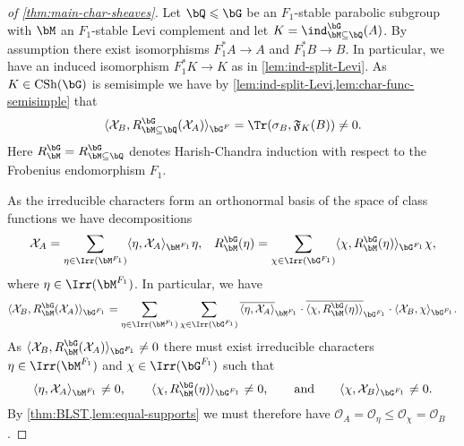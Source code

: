 \documentclass[eqthmnum,nocolour,skinny]{jt-calcs}
\DeclareMathOperator{\CS}{CSh}
\begin{document}
\begin{proof}[of \cref{thm:main-char-sheaves}]
Let $\bQ \leqslant \bG$ be an $F_1$-stable parabolic subgroup with $\bM$ an $F_1$-stable Levi complement and let $K = \ind_{\bM\subseteq\bQ}^{\bG}(A)$. By assumption there exist isomorphisms $F_1^*A \to A$ and $F_1^*B \to B$. In particular, we have an induced isomorphism $F_1^*K \to K$ as in \cref{lem:ind-split-Levi}. As $K \in \CS(\bG)$ is semisimple we have by \cref{lem:ind-split-Levi,lem:char-func-semisimple} that
\begin{equation*}
\langle \mathcal{X}_B, R_{\bM\subseteq\bQ}^{\bG}(\mathcal{X}_A) \rangle_{\bG^F} = \Tr(\sigma_B,\mathfrak{F}_K(B)) \neq 0.
\end{equation*}
Here $R_{\bM}^{\bG} = R_{\bM\subseteq\bQ}^{\bG}$ denotes Harish-Chandra induction with respect to the Frobenius endomorphism $F_1$.

As the irreducible characters form an orthonormal basis of the space of class functions we have decompositions
\begin{align*}
\mathcal{X}_A = \sum_{\eta \in \Irr(\bM^{F_1})} \langle \eta, \mathcal{X}_A\rangle_{\bM^{F_1}}\eta, &&  R_{\bM}^{\bG}(\eta) = \sum_{\chi \in \Irr(\bG^{F_1})} \langle \chi, R_{\bM}^{\bG}(\eta)\rangle_{\bG^{F_1}}\chi,
\end{align*}
where $\eta \in \Irr(\bM^{F_1})$. In particular, we have
\begin{equation*}
\langle \mathcal{X}_B, R_{\bM}^{\bG}(\mathcal{X}_A)\rangle_{\bG^{F_1}} = \sum_{\eta \in \Irr(\bM^{F_1})}\sum_{\chi \in \Irr(\bG^{F_1})} \overline{\langle \eta, \mathcal{X}_A\rangle}_{\bM^{F_1}}\cdot\overline{\langle \chi, R_{\bM}^{\bG}(\eta)\rangle}_{\bG^{F_1}}\cdot\langle \mathcal{X}_B, \chi\rangle_{\bG^{F_1}}.
\end{equation*}
As $\langle \mathcal{X}_B, R_{\bM}^{\bG}(\mathcal{X}_A)\rangle_{\bG^{F_1}} \neq 0$ there must exist irreducible characters $\eta \in \Irr(\bM^{F_1})$ and $\chi \in \Irr(\bG^{F_1})$ such that
\begin{equation*}
\langle \eta, \mathcal{X}_A\rangle_{\bM^{F_1}} \neq 0, \qquad \langle \chi, R_{\bM}^{\bG}(\eta)\rangle_{\bG^{F_1}} \neq 0, \qquad\text{and}\qquad \langle \chi,\mathcal{X}_B\rangle_{\bG^{F_1}} \neq 0.
\end{equation*}
By \cref{thm:BLST,lem:equal-supports} we must therefore have $\mathcal{O}_A = \mathcal{O}_{\eta} \leqslant \mathcal{O}_{\chi} = \mathcal{O}_B$.
\end{proof}
\end{document}
